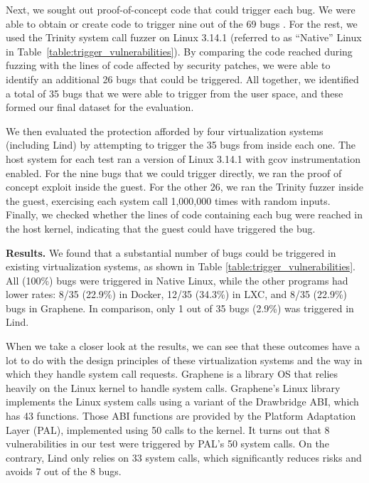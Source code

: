 {{{Next, we sought out proof-of-concept code that could trigger each bug.
We were able to obtain or create code to trigger nine out of the 69 bugs \cite{Exploit-Database}.
For the rest, we used the Trinity system call fuzzer
\cite{Trinity} on Linux 3.14.1 (referred to as ``Native'' Linux in Table~\ref{table:trigger_vulnerabilities}).
By comparing the code reached during fuzzing with the lines of code affected by security patches,
we were able to identify an additional 26 bugs that could be triggered. 
All together, we identified a total of 35 bugs that we were able to trigger from the user space, and these formed our final dataset for the evaluation. 

We then evaluated the protection afforded by four virtualization systems (including Lind) by attempting to trigger the 35 bugs from inside each one.
The host system for each test ran a version of Linux 3.14.1 with gcov instrumentation enabled.
For the nine bugs that we could trigger directly, we ran the proof of concept exploit inside the guest.
For the other 26, we ran the Trinity fuzzer inside the guest, exercising each system call 1,000,000 times with random inputs.
Finally, we checked whether the lines of code containing each bug were reached in the host kernel,
indicating that the guest could have triggered the bug.

\noindent
\textbf{Results.}
We found that a substantial number of bugs could be triggered in existing
virtualization systems, as shown in Table \ref{table:trigger_vulnerabilities}.
All (100\%) bugs were triggered in Native Linux,
while the other programs had lower rates: 8/35 (22.9\%)  in Docker,
12/35 (34.3\%)  in LXC, and 8/35 (22.9\%) bugs in Graphene.
In comparison, only 1 out of 35 bugs  (2.9\%) was triggered in Lind.

When we take a closer look at the results, we can see that these outcomes
have a lot to do with the design principles of these virtualization systems and
the way in which they handle system call requests.
Graphene \cite{Graphene-14} is a library OS that relies heavily on the Linux kernel to handle system calls.
Graphene's Linux library implements the Linux system calls using a variant of the
Drawbridge \cite{Drawbridge-11} ABI, which has 43 functions. Those ABI functions
are provided by the Platform Adaptation Layer (PAL), implemented using 50 calls
to the kernel. It turns out that 8 vulnerabilities in our test were triggered by PAL's
50 system calls. On the contrary, Lind only relies on 33 system calls, which significantly reduces
risks and avoids 7 out of the 8 bugs.

}}}
